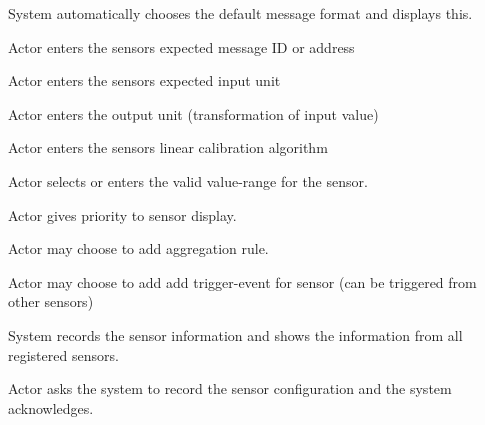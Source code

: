 \begin{usecase}
{			\item \label{uc_sensconf:messformat}System automatically chooses the default message format and
			displays this. 
			\item Actor enters the sensors expected message ID or address
			\item Actor enters the sensors expected input unit
			\item Actor enters the output unit (transformation of input value)
			\item Actor enters the sensors linear calibration algorithm 
			\item \label{uc_sensconf:value_range}Actor selects or enters the valid value-range for the sensor. 
			\item Actor gives priority to sensor display.
			\item Actor may choose to add aggregation rule.
			\item Actor may choose to add add trigger-event for sensor (can be triggered from
			other sensors)
			\item \label{uc_sensconf:stop}System records the sensor information and shows the information from all registered sensors. 
			\item \label{uc_sensconf:save}Actor asks the system to record the sensor configuration and the system acknowledges. 
		}
\end{usecase}
